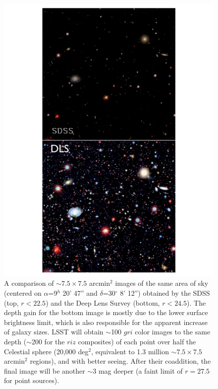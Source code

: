 \documentclass{emulateapj}
\begin{document}
\begin{figure}
\hskip -0.8in
\includegraphics[width=1.5\hsize,clip]{panels1_2.pdf}
\caption{A comparison of $\sim7.5\times7.5$ arcmin$^2$ images of
the same area of sky (centered on $\alpha$=9$^h$ 20' 47'' and 
$\delta$=30$^\circ$ 8' 12'') obtained by the SDSS (top, $r<22.5$) and 
the Deep Lens Survey (bottom, $r<24.5$). The depth gain for the bottom image
is mostly due to the lower surface brightness limit, which is also responsible 
for the apparent increase of galaxy sizes. LSST will obtain $\sim$100 $gri$ 
color images to the same depth ($\sim$200 for the $riz$ composites) of each point 
over half the Celestial sphere (20,000 deg$^2$, equivalent to 1.3 million $\sim7.5\times7.5$
arcmin$^2$ regions), and with better seeing. After their coaddition, the final 
image will be another $\sim3$ mag deeper (a faint limit of $r=27.5$ for point 
sources).} 
\label{Fig:panels1}
\end{figure}
\end{document}
